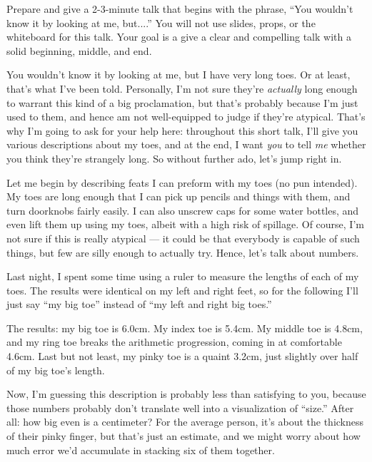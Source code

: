 \documentclass{fkpset}
\begin{document}
\begin{problem}[Prompt]
  Prepare and give a 2-3-minute talk that begins with the phrase, ``You wouldn't
  know it by looking at me, but....'' You will not use slides, props, or the
  whiteboard for this talk. Your goal is a give a clear and compelling talk with
  a solid beginning, middle, and end.
\end{problem}
\begin{solution}[Outline.]\setlength{\parindent}{1.5em}
  You wouldn't know it by looking at me, but I have very long toes. Or at least,
  that's what I've been told. Personally, I'm not sure they're \emph{actually}
  long enough to warrant this kind of a big proclamation, but that's probably
  because I'm just used to them, and hence am not well-equipped to judge if
  they're atypical. That's why I'm going to ask for your help here: throughout
  this short talk, I'll give you various descriptions about my toes, and at the
  end, I want \emph{you} to tell \emph{me} whether you think they're strangely
  long. So without further ado, let's jump right in.

  Let me begin by describing feats I can preform with my toes (no pun intended).
  My toes are long enough that I can pick up pencils and things with them, and
  turn doorknobs fairly easily. I can also unscrew caps for some water bottles,
  and even lift them up using my toes, albeit with a high risk of spillage. Of
  course, I'm not sure if this is really atypical --- it could be that everybody
  is capable of such things, but few are silly enough to actually try. Hence,
  let's talk about numbers.

  Last night, I spent some time using a ruler to measure the lengths of each of
  my toes. The results were identical on my left and right feet, so for the
  following I'll just say ``my big toe'' instead of ``my left and right big
  toes.''

  The results: my big toe is 6.0\si{cm}. My index toe is 5.4\si{cm}. My middle
  toe is 4.8\si{cm}, and my ring toe breaks the arithmetic progression, coming
  in at comfortable 4.6\si{cm}. Last but not least, my pinky toe is a quaint
  3.2\si{cm}, just slightly over half of my big toe's length.

  Now, I'm guessing this description is probably less than satisfying to you,
  because those numbers probably don't translate well into a visualization of
  ``size.'' After all: how big even is a centimeter? For the average person,
  it's about the thickness of their pinky finger, but that's just an estimate,
  and we might worry about how much error we'd accumulate in stacking six of
  them together.


\end{solution}
\end{document}
